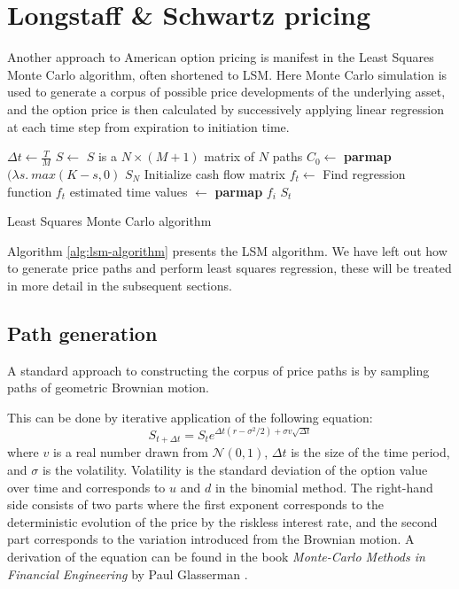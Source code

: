 \section{Longstaff \& Schwartz pricing}
Another approach to American option pricing is manifest in the Least
Squares Monte Carlo algorithm, often shortened to LSM. Here Monte
Carlo simulation is used to generate a corpus of possible price
developments of the underlying asset, and the option price is then
calculated by successively applying linear regression at each time
step from expiration to initiation time.


\begin{algorithm}
  \begin{algorithmic}
    \State $\Delta t \gets \frac{T}{M}$
    \State $S \gets$  \Comment $S$ is a $N \times (M+1)$ matrix of $N$ paths
    \State $C_0 \gets $ \textbf{parmap} $(\lambda s.\ max(K-s, 0)$ $S_N$ \Comment Initialize cash flow matrix
    \State $f_t \gets$  \Comment Find regression function $f_t$
    \State estimated time values $\gets$ \textbf{parmap} $f_i$ $S_t$
    \EndFor
    \EndFunction
  \end{algorithmic}
  
  \caption{Least Squares Monte Carlo algorithm}
  \label{alg:lsm-algorithm}
\end{algorithm}

Algorithm \ref{alg:lsm-algorithm} presents the LSM algorithm. We have
left out how to generate price paths and perform least squares
regression, these will be treated in more detail in the subsequent
sections.

\subsection{Path generation}
A standard approach to constructing the corpus of price paths is by
sampling paths of geometric Brownian motion.

This can be done by iterative application of the following equation:
$$S_{t+\Delta t}=S_te^{\Delta t(r-\sigma^2/2) + \sigma v\sqrt{\Delta t}}$$ where 
$v$ is a real number drawn from $\mathcal{N}(0,1)$, $\Delta t$ is the
size of the time period, and $\sigma$ is the volatility. Volatility is
the standard deviation of the option value over time and corresponds
to $u$ and $d$ in the binomial method. The right-hand side consists of
two parts where the first exponent corresponds to the deterministic
evolution of the price by the riskless interest rate, and the second
part corresponds to the variation introduced from the Brownian
motion. A derivation of the equation can be found in the book
\emph{Monte-Carlo Methods in Financial Engineering} by Paul Glasserman
\cite[Section 3.2]{glasserman2003monte}.

